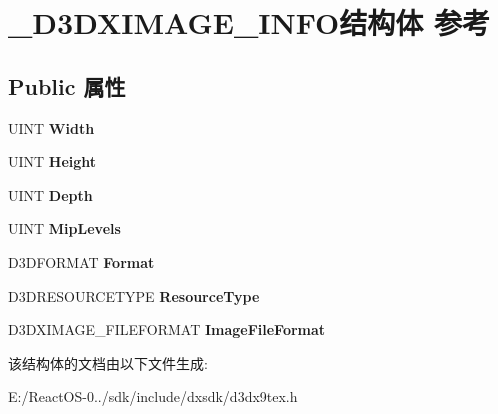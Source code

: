 \hypertarget{struct___d3_d_x_i_m_a_g_e___i_n_f_o}{}\section{\+\_\+\+D3\+D\+X\+I\+M\+A\+G\+E\+\_\+\+I\+N\+F\+O结构体 参考}
\label{struct___d3_d_x_i_m_a_g_e___i_n_f_o}
\subsection*{Public 属性}
\begin{DoxyCompactItemize}
\item 
\mbox{\label{struct___d3_d_x_i_m_a_g_e___i_n_f_o_ab06dcaeacf0aae89bc304f9aa9e70c6a}} 
U\+I\+NT {\bfseries Width}
\item 
\mbox{\label{struct___d3_d_x_i_m_a_g_e___i_n_f_o_a03ab1d131e4aac656c09e60c901804d5}} 
U\+I\+NT {\bfseries Height}
\item 
\mbox{\label{struct___d3_d_x_i_m_a_g_e___i_n_f_o_a033e37684920c362098cb90ffaa2266a}} 
U\+I\+NT {\bfseries Depth}
\item 
\mbox{\label{struct___d3_d_x_i_m_a_g_e___i_n_f_o_a57da7fa0a9ebe0a1e9f9e4b723c0bc7b}} 
U\+I\+NT {\bfseries Mip\+Levels}
\item 
\mbox{\label{struct___d3_d_x_i_m_a_g_e___i_n_f_o_aee83d7f2994cd735abc2ec83fb1866e7}} 
D3\+D\+F\+O\+R\+M\+AT {\bfseries Format}
\item 
\mbox{\label{struct___d3_d_x_i_m_a_g_e___i_n_f_o_a5dbdb542fc1dd12880334d7d0daa9da2}} 
D3\+D\+R\+E\+S\+O\+U\+R\+C\+E\+T\+Y\+PE {\bfseries Resource\+Type}
\item 
\mbox{\label{struct___d3_d_x_i_m_a_g_e___i_n_f_o_a672163fe3dda9a2acbceb8817438b53c}} 
D3\+D\+X\+I\+M\+A\+G\+E\+\_\+\+F\+I\+L\+E\+F\+O\+R\+M\+AT {\bfseries Image\+File\+Format}
\end{DoxyCompactItemize}


该结构体的文档由以下文件生成\+:\begin{DoxyCompactItemize}
\item 
E\+:/\+React\+O\+S-\/0../sdk/include/dxsdk/d3dx9tex.\+h\end{DoxyCompactItemize}
